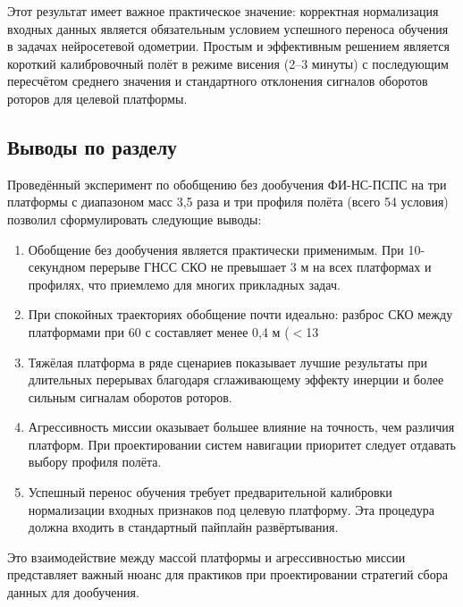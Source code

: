 Этот результат имеет важное практическое значение: корректная нормализация входных данных является обязательным условием успешного переноса обучения в задачах нейросетевой одометрии. Простым и эффективным решением является короткий калибровочный полёт в режиме висения (2--3 минуты) с последующим пересчётом среднего значения и стандартного отклонения сигналов оборотов роторов для целевой платформы.

\subsection{Выводы по разделу}

Проведённый эксперимент по обобщению без дообучения ФИ-НС-ПСПС на три платформы с диапазоном масс 3,5 раза и три профиля полёта (всего 54 условия) позволил сформулировать следующие выводы:

\begin{enumerate}
	\item Обобщение без дообучения является практически применимым. При 10-секундном перерыве ГНСС СКО не превышает 3 м на всех платформах и профилях, что приемлемо для многих прикладных задач.
	
	\item При спокойных траекториях обобщение почти идеально: разброс СКО между платформами при 60 с составляет менее 0,4 м ($<$13 %
	
	\item Тяжёлая платформа в ряде сценариев показывает лучшие результаты при длительных перерывах благодаря сглаживающему эффекту инерции и более сильным сигналам оборотов роторов.
	
	\item Агрессивность миссии оказывает большее влияние на точность, чем различия платформ. При проектировании систем навигации приоритет следует отдавать выбору профиля полёта.
	
	\item Успешный перенос обучения требует предварительной калибровки нормализации входных признаков под целевую платформу. Эта процедура должна входить в стандартный пайплайн развёртывания.
\end{enumerate}	Это взаимодействие между массой платформы и агрессивностью миссии представляет важный нюанс для практиков при проектировании стратегий сбора данных для дообучения.
	
